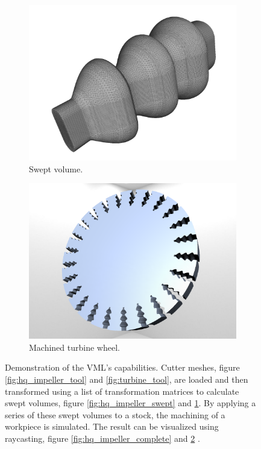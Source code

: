 \begin{figure}[h]
\begin{subfigure}[t]{0.32\textwidth}
			\includegraphics[width=\textwidth]{images/turbine_swept}
			\caption{Swept volume.}
			\label{fig:turbine_swept}
		\end{subfigure}
		\begin{subfigure}[t]{0.32\textwidth}
			\centering
			\includegraphics[width=\textwidth]{images/turbine_complete}
			\caption{Machined turbine wheel.}
			\label{fig:turbine_complete}
		\end{subfigure}
	\caption{
		Demonstration of the VML's capabilities.
		Cutter meshes, figure \ref{fig:hq_impeller_tool} and \ref{fig:turbine_tool}, are loaded and then transformed using a list of transformation matrices to calculate swept volumes, figure \ref{fig:hq_impeller_swept} and \ref{fig:turbine_swept}.
		By applying a series of these swept volumes to a stock, the machining of a workpiece is simulated.
		The result can be visualized using raycasting, figure \ref{fig:hq_impeller_complete} and \ref{fig:turbine_complete} \cite{engrave_report}.
	}
	\label{fig:vml_demo}
\end{figure}


